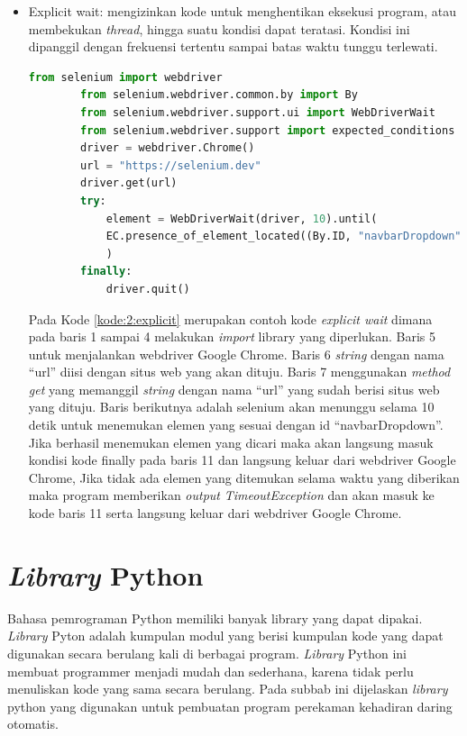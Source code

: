 \begin{itemize}
	\item Explicit wait: mengizinkan kode untuk menghentikan eksekusi program, atau membekukan \textit{thread}, hingga suatu kondisi dapat teratasi. Kondisi ini dipanggil dengan frekuensi tertentu sampai batas waktu tunggu terlewati.
	\begin{lstlisting}[language=python, caption=Contoh kode Explicit wait, label=kode:2:explicit]
		from selenium import webdriver
		from selenium.webdriver.common.by import By
		from selenium.webdriver.support.ui import WebDriverWait
		from selenium.webdriver.support import expected_conditions as EC
		driver = webdriver.Chrome()
		url = "https://selenium.dev"
		driver.get(url)	
		try:
			element = WebDriverWait(driver, 10).until(
			EC.presence_of_element_located((By.ID, "navbarDropdown"))
			)
		finally:
			driver.quit()
	\end{lstlisting}
	Pada Kode \ref{kode:2:explicit} merupakan contoh kode \textit{explicit wait} dimana pada baris 1 sampai 4 melakukan \textit{import} library yang diperlukan. Baris 5 untuk menjalankan webdriver Google Chrome. Baris 6 \textit{string} dengan nama ``url'' diisi dengan situs web yang akan dituju. Baris 7 menggunakan \textit{method get} yang memanggil \textit{string} dengan nama ``url'' yang sudah berisi situs web yang dituju. Baris berikutnya adalah selenium akan menunggu selama 10 detik untuk menemukan elemen yang sesuai dengan id ``navbarDropdown''. Jika berhasil menemukan elemen yang dicari maka akan langsung masuk kondisi kode finally pada baris 11 dan langsung keluar dari webdriver Google Chrome, Jika tidak ada elemen yang ditemukan selama waktu yang diberikan maka program memberikan \textit{output} \textit{TimeoutException} dan akan masuk ke kode baris 11 serta langsung keluar dari webdriver Google Chrome.	
\end{itemize}

\section{\textit{Library} Python}
\label{sec:library}
Bahasa pemrograman Python memiliki banyak library yang dapat dipakai. \textit{Library} Pyton adalah kumpulan modul yang berisi kumpulan kode yang dapat digunakan secara berulang kali di berbagai program. \textit{Library} Python ini membuat programmer menjadi mudah dan sederhana, karena tidak perlu menuliskan kode yang sama secara berulang. Pada subbab ini dijelaskan \textit{library} python yang digunakan untuk pembuatan program perekaman kehadiran daring otomatis.


